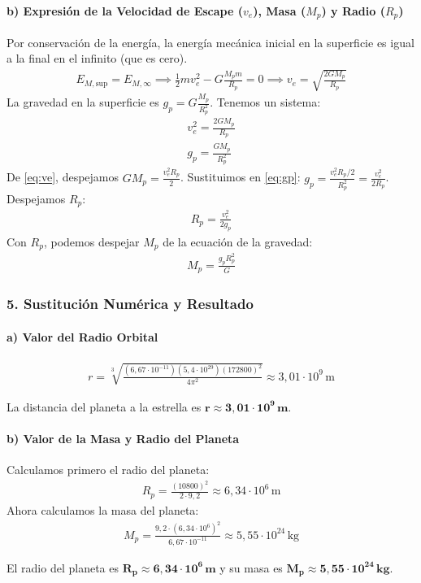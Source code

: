 \paragraph*{b) Expresión de la Velocidad de Escape ($v_e$), Masa ($M_p$) y Radio ($R_p$)}
Por conservación de la energía, la energía mecánica inicial en la superficie es igual a la final en el infinito (que es cero).
\begin{gather}
    E_{M, \text{sup}} = E_{M, \infty} \implies \frac{1}{2} m v_e^2 - G \frac{M_p m}{R_p} = 0 \implies v_e = \sqrt{\frac{2 G M_p}{R_p}}
\end{gather}
La gravedad en la superficie es $g_p = G \frac{M_p}{R_p^2}$. Tenemos un sistema:
\begin{gather}
    v_e^2 = \frac{2 G M_p}{R_p} \label{eq:ve} \\
    g_p = \frac{G M_p}{R_p^2} \label{eq:gp}
\end{gather}
De \eqref{eq:ve}, despejamos $G M_p = \frac{v_e^2 R_p}{2}$. Sustituimos en \eqref{eq:gp}:
$g_p = \frac{v_e^2 R_p / 2}{R_p^2} = \frac{v_e^2}{2 R_p}$. Despejamos $R_p$:
\begin{gather}
    R_p = \frac{v_e^2}{2 g_p}
\end{gather}
Con $R_p$, podemos despejar $M_p$ de la ecuación de la gravedad:
\begin{gather}
    M_p = \frac{g_p R_p^2}{G}
\end{gather}

\subsubsection*{5. Sustitución Numérica y Resultado}
\paragraph*{a) Valor del Radio Orbital}
\begin{gather}
    r = \sqrt[3]{\frac{(6,67 \cdot 10^{-11})(5,4 \cdot 10^{29})(172800)^2}{4\pi^2}} \approx 3,01 \cdot 10^{9} \, \text{m}
\end{gather}
\begin{cajaresultado}
    La distancia del planeta a la estrella es $\boldsymbol{r \approx 3,01 \cdot 10^{9} \, m}$.
\end{cajaresultado}

\paragraph*{b) Valor de la Masa y Radio del Planeta}
Calculamos primero el radio del planeta:
\begin{gather}
    R_p = \frac{(10800)^2}{2 \cdot 9,2} \approx 6,34 \cdot 10^6 \, \text{m}
\end{gather}
Ahora calculamos la masa del planeta:
\begin{gather}
    M_p = \frac{9,2 \cdot (6,34 \cdot 10^6)^2}{6,67 \cdot 10^{-11}} \approx 5,55 \cdot 10^{24} \, \text{kg}
\end{gather}
\begin{cajaresultado}
    El radio del planeta es $\boldsymbol{R_p \approx 6,34 \cdot 10^6 \, m}$ y su masa es $\boldsymbol{M_p \approx 5,55 \cdot 10^{24} \, kg}$.
\end{cajaresultado}

